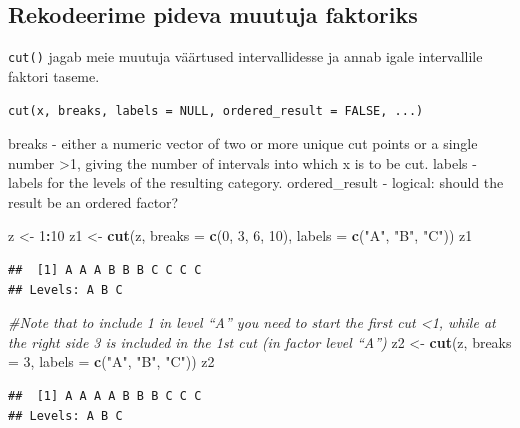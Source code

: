 \documentclass[]{book}
\newenvironment{Shaded}{\begin{snugshade}}{\end{snugshade}}
\newcommand{\KeywordTok}[1]{\textcolor[rgb]{0.13,0.29,0.53}{\textbf{#1}}}
\newcommand{\DataTypeTok}[1]{\textcolor[rgb]{0.13,0.29,0.53}{#1}}
\newcommand{\DecValTok}[1]{\textcolor[rgb]{0.00,0.00,0.81}{#1}}
\newcommand{\StringTok}[1]{\textcolor[rgb]{0.31,0.60,0.02}{#1}}
\newcommand{\CommentTok}[1]{\textcolor[rgb]{0.56,0.35,0.01}{\textit{#1}}}
\newcommand{\OperatorTok}[1]{\textcolor[rgb]{0.81,0.36,0.00}{\textbf{#1}}}
\newcommand{\NormalTok}[1]{#1}
\begin{document}
\subsection{Rekodeerime pideva muutuja
faktoriks}\label{rekodeerime-pideva-muutuja-faktoriks}

\texttt{cut()} jagab meie muutuja väärtused intervallidesse ja annab
igale intervallile faktori taseme.

\texttt{cut(x,\ breaks,\ labels\ =\ NULL,\ ordered\_result\ =\ FALSE,\ ...)}

breaks - either a numeric vector of two or more unique cut points or a
single number \textgreater{}1, giving the number of intervals into which
x is to be cut. labels - labels for the levels of the resulting
category. ordered\_result - logical: should the result be an ordered
factor?

\begin{Shaded}
\begin{Highlighting}[]
\NormalTok{z <-}\StringTok{ }\DecValTok{1}\OperatorTok{:}\DecValTok{10}
\NormalTok{z1 <-}\StringTok{ }\KeywordTok{cut}\NormalTok{(z, }\DataTypeTok{breaks =} \KeywordTok{c}\NormalTok{(}\DecValTok{0}\NormalTok{, }\DecValTok{3}\NormalTok{, }\DecValTok{6}\NormalTok{, }\DecValTok{10}\NormalTok{), }\DataTypeTok{labels =} \KeywordTok{c}\NormalTok{(}\StringTok{"A"}\NormalTok{, }\StringTok{"B"}\NormalTok{, }\StringTok{"C"}\NormalTok{))}
\NormalTok{z1}
\end{Highlighting}
\end{Shaded}

\begin{verbatim}
##  [1] A A A B B B C C C C
## Levels: A B C
\end{verbatim}

\begin{Shaded}
\begin{Highlighting}[]
\CommentTok{#Note that to include 1 in level “A” you need to start the first cut <1, while at the right side 3 is included in the 1st cut (in factor level “A”)}
\NormalTok{z2 <-}\StringTok{ }\KeywordTok{cut}\NormalTok{(z, }\DataTypeTok{breaks =} \DecValTok{3}\NormalTok{, }\DataTypeTok{labels =} \KeywordTok{c}\NormalTok{(}\StringTok{"A"}\NormalTok{, }\StringTok{"B"}\NormalTok{, }\StringTok{"C"}\NormalTok{))}
\NormalTok{z2}
\end{Highlighting}
\end{Shaded}

\begin{verbatim}
##  [1] A A A A B B B C C C
## Levels: A B C
\end{verbatim}
\end{document}
